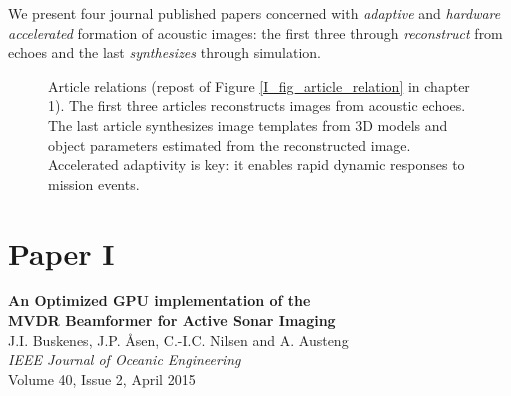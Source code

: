 %
% 


We present four journal published papers concerned with \emph{adaptive} and \emph{hardware accelerated} formation of acoustic images: the first three through \emph{reconstruct} from echoes and the last \emph{synthesizes} through simulation. 

\begin{figure}[tp]\label{III_fig_article_relation}
\caption{Article relations (repost of Figure \ref{I_fig_article_relation} in chapter 1). The first three articles reconstructs images from acoustic echoes. The last article synthesizes image templates from 3D models and object parameters estimated from the reconstructed image. Accelerated adaptivity is key: it enables rapid dynamic responses to mission events. }
\end{figure}


%
%


%

\section{Paper I}\label{sec:paperI} %
\textbf{An Optimized GPU implementation of the\\
MVDR Beamformer for Active Sonar Imaging}\\
J.I. Buskenes, J.P. Åsen, C.-I.C. Nilsen and A. Austeng\\
\textit{IEEE Journal of Oceanic Engineering}\\
Volume 40, Issue 2, April 2015

